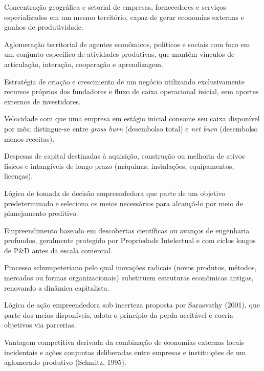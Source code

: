 \begin{description}[leftmargin=1.2em, style=nextline, itemsep=3pt]
  \item[Aglomeração Produtiva] Concentração geográfica e setorial de empresas, fornecedores e serviços especializados em um mesmo território, capaz de gerar economias externas e ganhos de produtividade.
  \item[APL (Arranjo Produtivo Local)] Aglomeração territorial de agentes econômicos, políticos e sociais com foco em um conjunto específico de atividades produtivas, que mantêm vínculos de articulação, interação, cooperação e aprendizagem.
  \item[Bootstrapping] Estratégia de criação e crescimento de um negócio utilizando exclusivamente recursos próprios dos fundadores e fluxo de caixa operacional inicial, sem aportes externos de investidores.
  \item[Burn Rate] Velocidade com que uma empresa em estágio inicial consome seu caixa disponível por mês; distingue-se entre \textit{gross burn} (desembolso total) e \textit{net burn} (desembolso menos receitas).
  \item[CAPEX (\textit{Capital Expenditure})] Despesas de capital destinadas à aquisição, construção ou melhoria de ativos físicos e intangíveis de longo prazo (máquinas, instalações, equipamentos, licenças).
  \item[Causation] Lógica de tomada de decisão empreendedora que parte de um objetivo predeterminado e seleciona os meios necessários para alcançá-lo por meio de planejamento preditivo.
  \item[Deep Tech] Empreendimento baseado em descobertas científicas ou avanços de engenharia profundos, geralmente protegido por Propriedade Intelectual e com ciclos longos de P\&D antes da escala comercial.
  \item[Destruição Criadora] Processo schumpeteriano pelo qual inovações radicais (novos produtos, métodos, mercados ou formas organizacionais) substituem estruturas econômicas antigas, renovando a dinâmica capitalista.
  \item[Effectuation] Lógica de ação empreendedora sob incerteza proposta por Sarasvathy (2001), que parte dos meios disponíveis, adota o princípio da perda aceitável e cocria objetivos via parcerias.
  \item[Eficiência Coletiva] Vantagem competitiva derivada da combinação de economias externas locais incidentais e ações conjuntas deliberadas entre empresas e instituições de um aglomerado produtivo (Schmitz, 1995).

\end{description}

